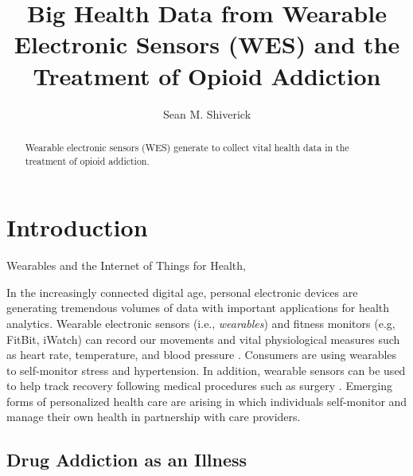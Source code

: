 \documentclass[sigconf]{acmart}
\begin{document}
\title{Big Health Data from Wearable Electronic Sensors (WES) and 
the Treatment of Opioid Addiction}

\author{Sean M. Shiverick}


\begin{abstract}
Wearable electronic sensors (WES) generate to collect
vital health data in the treatment of opioid addiction. 
\end{abstract}


\maketitle


\section{Introduction}

Wearables and the Internet of Things for Health, 

In the increasingly connected digital age, personal electronic devices are 
generating tremendous volumes of data with important applications for 
health analytics. Wearable electronic sensors (i.e., \emph{wearables}) and
fitness monitors (e.g, FitBit, iWatch) can record our movements and vital 
physiological measures such as heart rate, temperature, and blood pressure 
\cite{metcalf16}. Consumers are using wearables to self-monitor stress 
and hypertension. In addition, wearable sensors can be used to help track
recovery following medical procedures such as surgery \cite{atallah11}. 
Emerging forms of personalized health care are arising in which individuals 
self-monitor and manage their own health in partnership with care providers.

\subsection{Drug Addiction as an Illness}
\end{document}
